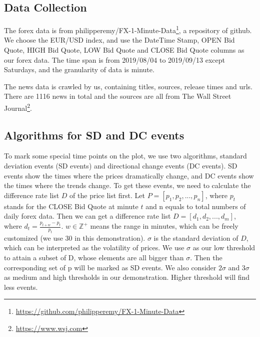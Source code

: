 \documentclass[sigconf]{acmart}
\begin{document}
\subsection{Data Collection}
The forex data is from philipperemy/FX-1-Minute-Data\footnote{\url{https://github.com/philipperemy/FX-1-Minute-Data}}, a repository of github. We choose the EUR/USD index, and use the DateTime Stamp, OPEN Bid Quote, HIGH Bid Quote, LOW Bid Quote and CLOSE Bid Quote columns as our forex data. The time span is from 2019/08/04 to 2019/09/13 except Saturdays, and the granularity of data is minute. 

The news data is crawled by us, containing titles, sources, release times and urls. There are 1116 news in total and the sources are all from The Wall Street Journal\footnote{\url{https://www.wsj.com}}.

\subsection{Algorithms for SD and DC events}
To mark some special time points on the plot, we use two algorithms, standard deviation events (SD events) and directional change events (DC events)\cite{7850020}. SD events show the times where the prices dramatically change, and DC events show the times where the trends change. To get these events, we need to calculate the difference rate list $D$ of the price list first. 
Let $P= [p_1, p_2, ..., p_n]$, where $p_t$ stands for the CLOSE Bid Quote at minute $t$ and n equals to total numbers of daily forex data. Then we can get a difference rate list $D= [d_1, d_2, ..., d_m]$, where $d_t = \frac{p_{t+w}-p_t}{p_t}$.  $w\in\mathbb Z^+$ means the range in minutes, which can be freely customized (we use 30 in this demonstration).
$\sigma$ is the standard deviation of $D$, which can be interpreted as the volatility of prices. We use $\sigma$ as our low threshold to attain a subset of D, whose elements are all bigger than $\sigma$. Then the corresponding set of p will be marked as SD events. We also consider $2\sigma$ and $3\sigma$ as medium and high thresholds in our demonstration. Higher threshold will find less events.
\end{document}
